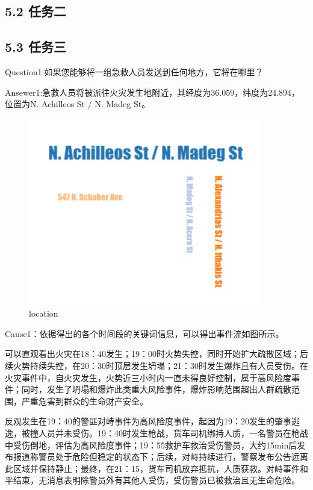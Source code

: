 \documentclass[a4paper]{article}
\begin{document}
\subsection*{ 5.2 任务二}
\subsection*{ 5.3 任务三}
Question1:如果您能够将一组急救人员发送到任何地方，它将在哪里？

Ansewer1:急救人员将被派往火灾发生地附近，其经度为36.059，纬度为24.894，位置为N. Achilleos St / N. Madeg St。

\begin{figure}[H]
    \centering
    \includegraphics[width=0.9\textwidth]{images/3-2.png}
    \caption{location}\label{fig:3-2}
    \vspace{\baselineskip}
\end{figure}

Cause1：依据得出的各个时间段的关键词信息，可以得出事件流如图所示。

可以直观看出火灾在18：40发生；19：00时火势失控，同时开始扩大疏散区域；后续火势持续失控，在20：30时顶层发生坍塌；21：30时发生爆炸且有人员受伤。在火灾事件中，自火灾发生，火势近三小时内一直未得良好控制，属于高风险度事件；同时，发生了坍塌和爆炸此类重大风险事件，爆炸影响范围超出人群疏散范围，严重危害到群众的生命财产安全。

反观发生在19：40的警匪对峙事件为高风险度事件，起因为19：20发生的肇事逃逸，被撞人员并未受伤。19：40时发生枪战，货车司机绑持人质，一名警员在枪战中受伤倒地，评估为高风险度事件；19：55救护车救治受伤警员，大约15min后发布报道称警员处于危险但稳定的状态下；后续，对峙持续进行，警察发布公告远离此区域并保持静止；最终，在21：15，货车司机放弃抵抗，人质获救。对峙事件和平结束，无消息表明除警员外有其他人受伤，受伤警员已被救治且无生命危险。
\end{document}
